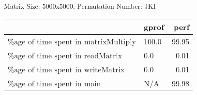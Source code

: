 \documentclass{article}
\begin{document}
    Matrix Size: 5000x5000, Permutation Number: JKI \\
    \begin{tabular}{llr}
\hline
                                      & gprof   &   perf \\
\hline
 \%age of time spent in matrixMultiply & 100.0   &  99.95 \\
 \%age of time spent in readMatrix     & 0.0     &   0.01 \\
 \%age of time spent in writeMatrix    & 0.0     &   0.01 \\
 \%age of time spent in main           & N/A     &  99.98 \\
\hline
\end{tabular}
    
\end{document}
